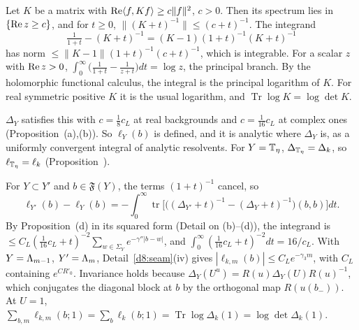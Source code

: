 \begin{detail}\label{d8:ix13}
\begin{step}
Let $K$ be a matrix with $\operatorname{Re}\langle f,Kf\rangle\ge c\|f\|^2$, $c>0$. Then its spectrum lies in $\{\operatorname{Re} z\ge c\}$, and for $t\ge0$, $\|(K+t)^{-1}\|\le(c+t)^{-1}$. The integrand
\[
\tfrac1{1+t}-(K+t)^{-1}=(K-1)(1+t)^{-1}(K+t)^{-1}
\]
has norm $\le\|K-1\|(1+t)^{-1}(c+t)^{-1}$, which is integrable. For a scalar $z$ with $\operatorname{Re} z>0$, $\int_0^\infty\big(\frac1{1+t}-\frac1{z+t}\big)dt=\log z$, the principal branch. By the holomorphic functional calculus, the integral is the principal logarithm of $K$. For real symmetric positive $K$ it is the usual logarithm, and $\operatorname{Tr}\log K=\log\det K$.
\end{step}
\begin{step}[Use]
$\Delta_Y$ satisfies this with $c=\frac18c_L$ at real backgrounds and $c=\frac1{16}c_L$ at complex ones (Proposition~(a),(b)). So $\ell_Y(b)$ is defined, and it is analytic where $\Delta_Y$ is, as a uniformly convergent integral of analytic resolvents. For $Y=\mathbb T_\eta$, $\Delta_{\mathbb T_\eta}=\Delta_k$, so $\ell_{\mathbb T_\eta}=\ell_k$ (Proposition~).
\end{step}
\end{detail}

\begin{detail}[Proposition~\Nref{prop:det-local}, and the sums at $U=1$. Off the main line]\label{d8:ix14}
For $Y\subset Y'$ and $b\in\mathfrak F(Y)$, the terms $(1+t)^{-1}$ cancel, so
\[
\ell_{Y'}(b)-\ell_Y(b)=-\int_0^\infty\operatorname{tr}\big[\big((\Delta_{Y'}+t)^{-1}-(\Delta_Y+t)^{-1}\big)(b,b)\big]dt .
\]
By Proposition~(d) in its squared form (Detail on (b)--(d)), the integrand is $\le C_L(\frac1{16}c_L+t)^{-2}\sum_{w\in\Sigma_Y}e^{-\gamma''|b-w|}$, and $\int_0^\infty(\frac1{16}c_L+t)^{-2}dt=16/c_L$. With $Y=\Lambda_{m-1}$, $Y'=\Lambda_m$, Detail~\ref{d8:seam}(iv) gives $|\ell_{k,m}(b)|\le C_Le^{-\gamma_3m}$, with $C_L$ containing $e^{CR'_0}$. Invariance holds because $\Delta_Y(U^u)=R(u)\Delta_Y(U)R(u)^{-1}$, which conjugates the diagonal block at $b$ by the orthogonal map $R(u(b_-))$. At $U=1$, $\sum_{b,m}\ell_{k,m}(b;1)=\sum_b\ell_k(b;1)=\operatorname{Tr}\log\Delta_k(1)=\log\det\Delta_k(1)$.
\end{detail}

